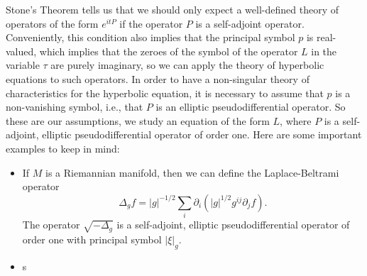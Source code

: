 \documentclass{article}
\theoremstyle{plain}
\theoremstyle{remark}
\theoremstyle{definition}
\begin{document}
Stone's Theorem tells us that we should only expect a well-defined theory of operators of the form $e^{itP}$ if the operator $P$ is a self-adjoint operator. Conveniently, this condition also implies that the principal symbol $p$ is real-valued, which implies that the zeroes of the symbol of the operator $L$ in the variable $\tau$ are purely imaginary, so we can apply the theory of hyperbolic equations to such operators. In order to have a non-singular theory of characteristics for the hyperbolic equation, it is necessary to assume that $p$ is a non-vanishing symbol, i.e., that $P$ is an elliptic pseudodifferential operator. So these are our assumptions, we study an equation of the form $L$, where $P$ is a self-adjoint, elliptic pseudodifferential operator of order one. Here are some important examples to keep in mind:
%
\begin{itemize}
	\item If $M$ is a Riemannian manifold, then we can define the Laplace-Beltrami operator
	\[ \Delta_g f = |g|^{-1/2} \sum_i \partial_i ( |g|^{1/2} g^{ij} \partial_ j f ). \]
	The operator $\sqrt{-\Delta_g}$ is a self-adjoint, elliptic pseudodifferential operator of order one with principal symbol $|\xi|_g$.

	\item s 
\end{itemize}

\begin{thebibliography}{9}

\end{thebibliography}
\end{document}
